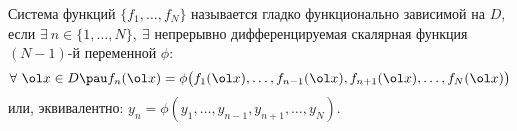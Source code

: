
Система функций $\{f_1,\ldots,f_N\}$ называется гладко функционально зависимой на $D$, если $\exists\ n\in\{1,\ldots,N\},\ \exists$ непрерывно дифференцируемая скалярная функция $(N-1)$-й переменной $\phi\colon$
\[\forall\ \ol x\in D\pau f_n(\ol x) = \phi \big(f_1(\ol x),\ldots,f_{n-1}(\ol x),f_{n+1}(\ol x),\ldots,f_N(\ol x)\big)\]
или, эквивалентно: $y_n=\phi(y_1,\ldots,y_{n-1},y_{n+1},\ldots,y_N)$.
